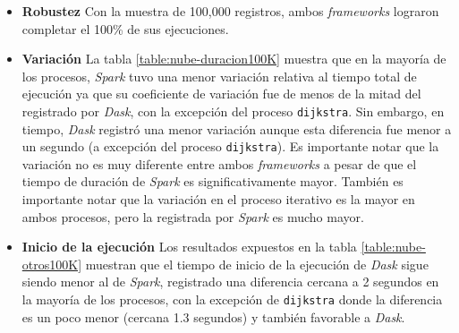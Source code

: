 \begin{itemize}
	
	\item \textbf{Robustez} Con la muestra de 100,000 registros, ambos \textit{frameworks} lograron completar el 100\% de sus ejecuciones.
	
	\item \textbf{Variación} La tabla \ref{table:nube-duracion100K} muestra que en la mayoría de los procesos, \textit{Spark} tuvo una menor variación relativa al tiempo total de ejecución ya que su coeficiente de variación fue de menos de la mitad del registrado por \textit{Dask}, con la excepción del proceso \texttt{dijkstra}. Sin embargo, en tiempo, \textit{Dask} registró una menor variación aunque esta diferencia fue menor a un segundo (a excepción del proceso \texttt{dijkstra}). Es importante notar que la variación no es muy diferente entre ambos \textit{frameworks} a pesar de que el tiempo de duración de \textit{Spark} es significativamente mayor. También es importante notar que la variación en el proceso iterativo es la mayor en ambos procesos, pero la registrada por \textit{Spark} es mucho mayor.
	
	\item \textbf{Inicio de la ejecución} Los resultados expuestos en la tabla \ref{table:nube-otros100K} muestran que el tiempo de inicio de la ejecución de \textit{Dask} sigue siendo menor al de \textit{Spark}, registrado una diferencia cercana a 2 segundos en la mayoría de los procesos, con la excepción de \texttt{dijkstra} donde la diferencia es un poco menor (cercana 1.3 segundos) y también favorable a \textit{Dask}. 
	

\end{itemize}
